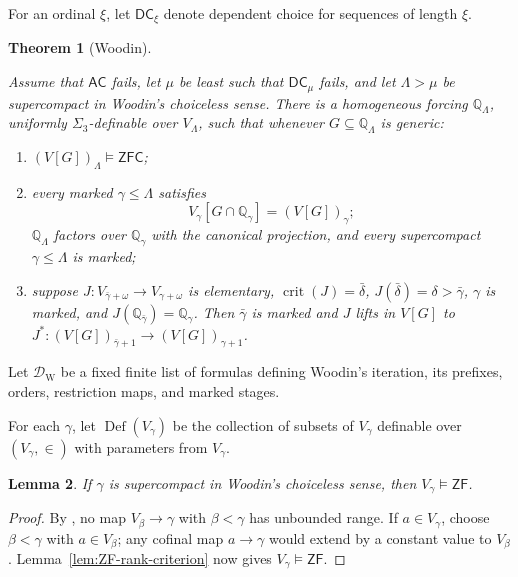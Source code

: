 \documentclass[11pt,a4paper]{amsart}
\newcommand{\AC}{\mathsf{AC}}
\newcommand{\ZF}{\mathsf{ZF}}
\newcommand{\ZFC}{\mathsf{ZFC}}
\newcommand{\Def}{\operatorname{Def}}
\newcommand{\DC}{\mathsf{DC}}
\newcommand{\crit}{\operatorname{crit}}
\theoremstyle{plain}
\newtheorem{theorem}{Theorem}[section]
\newtheorem{lemma}[theorem]{Lemma}
\theoremstyle{definition}
\theoremstyle{remark}
\begin{document}
For an ordinal $\xi$, let $\DC_\xi$ denote dependent choice for sequences of length $\xi$.

\begin{theorem}[Woodin]\label{thm:Woodin-forcing}

Assume that $\AC$ fails, let $\mu$ be least such that $\DC_\mu$ fails, and let $\Lambda>\mu$ be supercompact in Woodin's choiceless sense.  There is a homogeneous forcing $\mathbb Q_\Lambda$, uniformly $\Sigma_3$-definable over $V_\Lambda$, such that whenever $G\subseteq\mathbb Q_\Lambda$ is generic:

\begin{enumerate}
\item $(V[G])_\Lambda\models\ZFC$;
\item {every marked $\gamma\leq\Lambda$ satisfies
\[
V_\gamma[G\cap\mathbb Q_\gamma]=(V[G])_\gamma;
\]
$\mathbb Q_\Lambda$ factors over $\mathbb Q_\gamma$ with the canonical projection, and every supercompact $\gamma\leq\Lambda$ is marked;}
\item suppose $J:V_{\bar\gamma+\omega}\to V_{\gamma+\omega}$ is elementary, $\crit(J)=\bar\delta$, $J(\bar\delta)=\delta>\bar\gamma$, $\gamma$ is marked, and $J(\mathbb Q_{\bar\gamma})=\mathbb Q_\gamma$.  Then $\bar\gamma$ is marked and $J$ lifts in $V[G]$ to $J^*:(V[G])_{\bar\gamma+1}\longrightarrow(V[G])_{\gamma+1}$.
\end{enumerate}
\end{theorem}

Let $\mathcal D_{\mathrm W}$ be a fixed finite list of formulas defining Woodin's iteration, its prefixes, orders, restriction maps, and marked stages.

For each $\gamma$, let $\Def(V_\gamma)$ be the collection of subsets of $V_\gamma$ definable over $(V_\gamma,\in)$ with parameters from $V_\gamma$.

\begin{lemma}\label{lem:supercompact-rank-ZF}
If $\gamma$ is supercompact in Woodin's choiceless sense, then $V_\gamma\models\ZF$.
\end{lemma}

\begin{proof}

By \cite[Definition~19 and the proof of Theorem~44]{Spoerl}, no map $V_\beta\to\gamma$ with $\beta<\gamma$ has unbounded range.  If $a\in V_\gamma$, choose $\beta<\gamma$ with $a\in V_\beta$; any cofinal map $a\to\gamma$ would extend by a constant value to $V_\beta$.  Lemma~\ref{lem:ZF-rank-criterion} now gives $V_\gamma\models\ZF$.
\end{proof}
\end{document}
